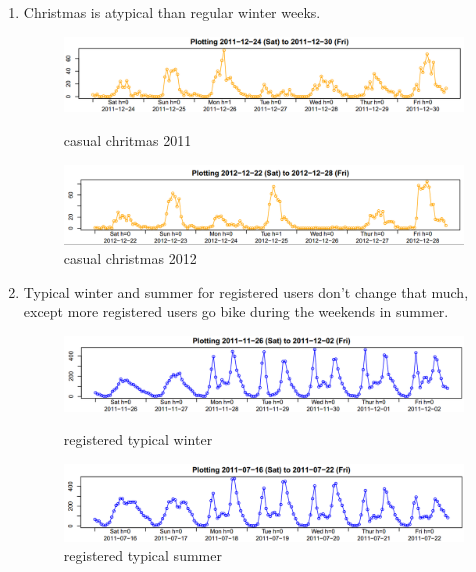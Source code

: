\documentclass[12pt]{article}
\begin{document}
\begin{enumerate}
	\item Christmas is atypical than regular winter weeks.
		 \begin{figure}[H]
		 	\centering
		 	\begin{minipage}{.5\textwidth}
		 		\centering
		 		\includegraphics[width=\linewidth]{figures/casual_chritmas_2011.png}
		 		\caption{casual chritmas 2011}
		 	\end{minipage}%
		 	\begin{minipage}{.5\textwidth}
		 		\centering
		 		\includegraphics[width=\linewidth]{figures/casual_christmas.png}
		 		\caption{casual christmas 2012}
		 	\end{minipage}
		 \end{figure}
		 
		 \item Typical winter and summer for registered users don't change that much, except more registered users go bike during the weekends in summer.
		 	\begin{figure}[H]
		 		\centering
		 		\begin{minipage}{.5\textwidth}
		 			\centering
		 			\includegraphics[width=\linewidth]{figures/registered_typical_winter.png}
		 			\caption{registered typical winter}
		 		\end{minipage}%
		 		\begin{minipage}{.5\textwidth}
		 			\centering
		 			\includegraphics[width=\linewidth]{figures/registered_typical_summer.png}
		 			\caption{registered typical summer}
		 		\end{minipage}
		 	\end{figure}
		 	

\end{enumerate}
\end{document}
